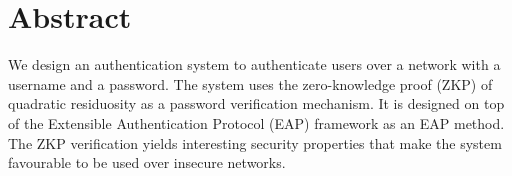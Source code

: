 \section*{Abstract} %
We design an authentication system to authenticate users over a network with a username and a password.
The system uses the zero-knowledge proof (ZKP) of quadratic residuosity as a password verification mechanism.
It is designed on top of the Extensible Authentication Protocol (EAP) framework as an EAP method.
The ZKP verification yields interesting security properties that make the system favourable to be used over insecure networks.

\newpage